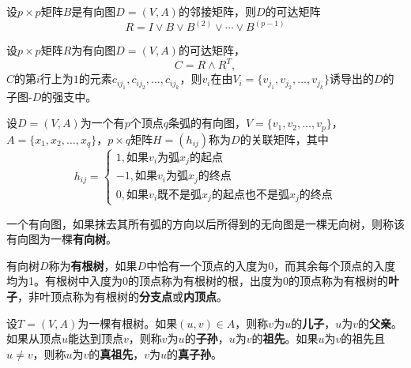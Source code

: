     \begin{Thm}
    设$p \times p$矩阵$B$是有向图$D=(V,A)$的邻接矩阵，则$D$的可达矩阵
    \[R = I \lor B \lor B^{(2)} \lor \cdots \lor B^{(p-1)}\]
  \end{Thm}
  \begin{Thm}
   设$p \times p$矩阵$R$为有向图$D=(V,A)$的可达矩阵， \[C=R \land R^T,\] $C$的第$i$行上为$1$的元素$c_{ij_1}, c_{ij_2}, \ldots, c_{ij_k}$，则$v_i$在由$V_i= \{v_{j_1}, v_{j_2}, \ldots, v_{j_k}\}$诱导出的$D$的子图-$D$的强支中。
 \end{Thm}
  \centering
 \begin{Def}
   设$D=(V,A)$为一个有$p$个顶点$q$条弧的有向图，$V=\{v_1,v_2,\ldots, v_p\}$，$A=\{x_1,x_2,\ldots,x_q\}$，$p\times q$矩阵$H=(h_{ij})$称为$D$的关联矩阵，其中
  \[h_{ij}=\begin{cases}
      1, \text{如果}v_i\text{为弧}x_j\text{的起点}\\
      -1, \text{如果}v_i\text{为弧}x_j\text{的终点}\\
      0, \text{如果}v_i\text{既不是弧}x_j\text{的起点也不是弧}x_j\text{的终点}
    \end{cases}
  \]
 \end{Def}

   \begin{Def}
    一个有向图，如果抹去其所有弧的方向以后所得到的无向图是一棵无向树，则称该有向图为一棵{\bfseries 有向树}。
  \end{Def}

    \begin{Def}
    有向树$D$称为{\bfseries 有根树}，如果$D$中恰有一个顶点的入度为0，而其余每个顶点的入度均为1。有根树中入度为0的顶点称为有根树的根，出度为0的顶点称为有根树的{\bfseries 叶子}，非叶顶点称为有根树的{\bfseries 分支点}或{\bfseries 内顶点}。
  \end{Def}

    \begin{Def}
  设$T=(V,A)$为一棵有根树。如果$(u,v)\in A$，则称$v$为$u$的{\bfseries 儿子}，$u$为$v$的{\bfseries 父亲}。如果从顶点$u$能达到顶点$v$，则称$v$为$u$的{\bfseries 子孙}，$u$为$v$的{\bfseries 祖先}。如果$u$为$v$的祖先且$u \neq v$，则称$u$为$v$的{\bfseries 真祖先}，$v$为$u$的{\bfseries 真子孙}。
  \end{Def}

